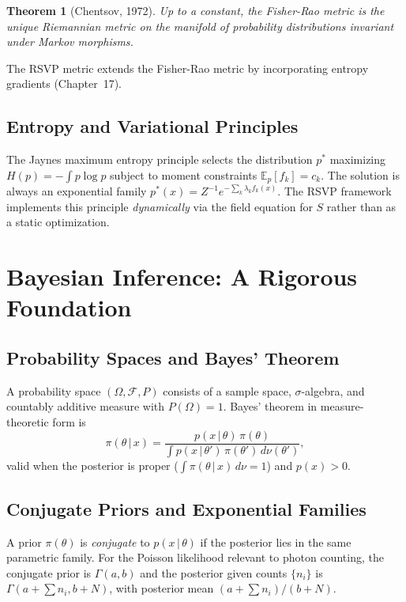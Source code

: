 \documentclass[11pt, openright, twoside]{book}
\theoremstyle{plain}
\newtheorem{theorem}{Theorem}[chapter]
\theoremstyle{definition}
\theoremstyle{remark}
\newcommand{\Sfield}{S}
\newcommand{\given}{\,|\,}
\begin{document}
\begin{theorem}[Chentsov, 1972]
Up to a constant, the Fisher-Rao metric is the unique Riemannian metric on the manifold of
probability distributions invariant under Markov morphisms.
\end{theorem}

The RSVP metric extends the Fisher-Rao metric by incorporating entropy gradients (Chapter~17).

\section{Entropy and Variational Principles}

The Jaynes maximum entropy principle selects the distribution $p^*$ maximizing
$H(p)=-\int p\log p$ subject to moment constraints $\mathbb{E}_p[f_k]=c_k$. The solution
is always an exponential family $p^*(x)=Z^{-1}e^{-\sum_k\lambda_k f_k(x)}$. The RSVP
framework implements this principle \emph{dynamically} via the field equation for
$\Sfield$ rather than as a static optimization.

\chapter{Bayesian Inference: A Rigorous Foundation}

\section{Probability Spaces and Bayes' Theorem}

A probability space $(\Omega,\mathcal{F},P)$ consists of a sample space, $\sigma$-algebra,
and countably additive measure with $P(\Omega)=1$. Bayes' theorem in measure-theoretic form
is
\begin{equation}
  \pi(\theta\given x) = \frac{p(x\given\theta)\,\pi(\theta)}
  {\int p(x\given\theta')\,\pi(\theta')\,d\nu(\theta')},
  \label{eq:bayes}
\end{equation}
valid when the posterior is proper ($\int\pi(\theta\given x)\,d\nu=1$) and $p(x)>0$.

\section{Conjugate Priors and Exponential Families}

A prior $\pi(\theta)$ is \emph{conjugate} to $p(x\given\theta)$ if the posterior lies in
the same parametric family. For the Poisson likelihood relevant to photon counting, the
conjugate prior is $\Gamma(a,b)$ and the posterior given counts $\{n_i\}$ is
$\Gamma(a+\sum n_i, b+N)$, with posterior mean $(a+\sum n_i)/(b+N)$.
\end{document}
